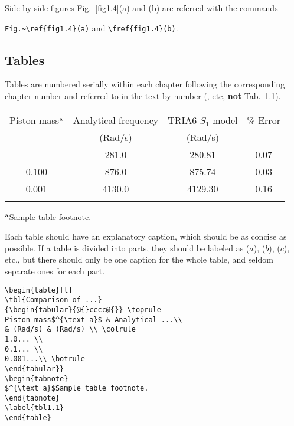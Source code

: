 Side-by-side figures Fig.~\ref{fig1.4}(a) and (b) are
referred with the commands\par\noindent \verb|Fig.~\ref{fig1.4}(a)| and
\verb|\fref{fig1.4}(b)|.

\subsection{Tables}
Tables are numbered serially within each chapter following the
corresponding chapter number and referred to in the text by number
(, etc, {\bf not} Tab.~1.1).

\begin{table}[b]
{\begin{tabular}{@{}cccc@{}} \toprule
Piston mass$^{\text a}$ & Analytical frequency & TRIA6-$S_1$ model & \% Error \\
& (Rad/s) & (Rad/s) \\ \colrule
1.000 & \hphantom{0}281.0 & \hphantom{0}280.81 & 0.07 \\
0.100 & \hphantom{0}876.0 & \hphantom{0}875.74 & 0.03 \\
0.001 & 4130.0 & 4129.30 & 0.16\\ \botrule
\end{tabular}
}
\begin{tabnote}
$^{\text a}$Sample table footnote.
\end{tabnote}
\label{tbl1.1}
\end{table}

Each table should
have an explanatory caption, which should be as concise as possible.
If a table is divided into parts, they should be labeled as ($a$),
($b$), ($c$), etc., but there should only be one caption for the
whole table, and seldom separate ones for each part.

\begin{verbatim}
\begin{table}[t]
\tbl{Comparison of ...}
{\begin{tabular}{@{}cccc@{}} \toprule
Piston mass$^{\text a}$ & Analytical ...\\
& (Rad/s) & (Rad/s) \\ \colrule
1.0... \\
0.1... \\
0.001...\\ \botrule
\end{tabular}}
\begin{tabnote}
$^{\text a}$Sample table footnote.
\end{tabnote}
\label{tbl1.1}
\end{table}
\end{verbatim}



